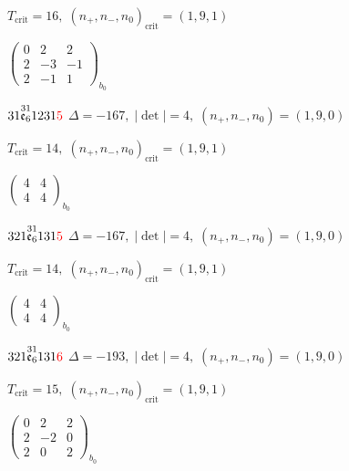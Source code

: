 \documentclass[10pt]{article}
\begin{document}
\hspace{1em}$T_{\text{crit}}=16,\; (n_+,n_-,n_0)_{\text{crit}}=(1,9,1)$

\hspace{2em}$\left(\begin{smallmatrix}0 & 2 & 2 \\ 2 & -3 & -1 \\ 2 & -1 & 1\end{smallmatrix}\right)_{\!b_0}$

\smallskip

$31\overset{31}{\mathfrak{e}_6}1231\textcolor{red}{5}$ \quad $\Delta=-167,\; |\det|=4,\; (n_+,n_-,n_0)=(1,9,0)$

\hspace{1em}$T_{\text{crit}}=14,\; (n_+,n_-,n_0)_{\text{crit}}=(1,9,1)$

\hspace{2em}$\left(\begin{smallmatrix}4 & 4 \\ 4 & 4\end{smallmatrix}\right)_{\!b_0}$

\smallskip

$321\overset{31}{\mathfrak{e}_6}131\textcolor{red}{5}$ \quad $\Delta=-167,\; |\det|=4,\; (n_+,n_-,n_0)=(1,9,0)$

\hspace{1em}$T_{\text{crit}}=14,\; (n_+,n_-,n_0)_{\text{crit}}=(1,9,1)$

\hspace{2em}$\left(\begin{smallmatrix}4 & 4 \\ 4 & 4\end{smallmatrix}\right)_{\!b_0}$

$321\overset{31}{\mathfrak{e}_6}131\textcolor{red}{6}$ \quad $\Delta=-193,\; |\det|=4,\; (n_+,n_-,n_0)=(1,9,0)$

\hspace{1em}$T_{\text{crit}}=15,\; (n_+,n_-,n_0)_{\text{crit}}=(1,9,1)$

\hspace{2em}$\left(\begin{smallmatrix}0 & 2 & 2 \\ 2 & -2 & 0 \\ 2 & 0 & 2\end{smallmatrix}\right)_{\!b_0}$

\smallskip
\end{document}
